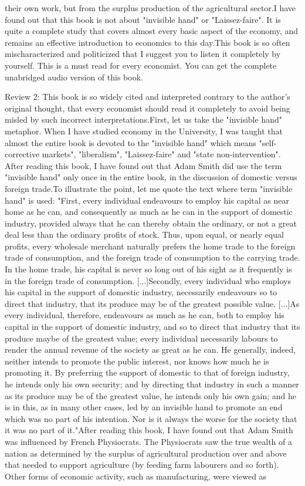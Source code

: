 \documentclass[12pt, a4paper[]{article}
\begin{document}
\begin{itemize}
{their own work, but from the surplus production of the agricultural sector.I have found out that this book is not about "invisible hand" or "Laissez-faire". It is quite a complete study that covers almost every basic aspect of the economy, and remains an effective introduction to economics to this day.This book is so often mischaracterized and politicized that I suggest you to listen it completely by yourself. This is a must read for every economist. You can get the complete unabridged audio version of this book.
    \item Review 2: This book is so widely cited and interpreted contrary to the author's original thought, that every economist should read it completely to avoid being misled by such incorrect interpretations.First, let us take the "invisible hand" metaphor. When I have studied economy in the University, I was taught that almost the entire book is devoted to the "invisible hand" which means "self-corrective markets", "liberalism", "Laissez-faire" and "state non-intervention". After reading this book, I have found out that Adam Smith did use the term "invisible hand" only once in the entire book, in the discussion of domestic versus foreign trade.To illustrate the point, let me quote the text where term "invisible hand" is used: "First, every individual endeavours to employ his capital as near home as he can, and consequently as much as he can in the support of domestic industry, provided always that he can thereby obtain the ordinary, or not a great deal less than the ordinary profits of stock. Thus, upon equal, or nearly equal profits, every wholesale merchant naturally prefers the home trade to the foreign trade of consumption, and the foreign trade of consumption to the carrying trade. In the home trade, his capital is never so long out of his sight as it frequently is in the foreign trade of consumption. [...]Secondly, every individual who employs his capital in the support of domestic industry, necessarily endeavours so to direct that industry, that its produce may be of the greatest possible value. [...]As every individual, therefore, endeavours as much as he can, both to employ his capital in the support of domestic industry, and so to direct that industry that its produce maybe of the greatest value; every individual necessarily labours to render the annual revenue of the society as great as he can. He generally, indeed, neither intends to promote the public interest, nor knows how much he is promoting it. By preferring the support of domestic to that of foreign industry, he intends only his own security; and by directing that industry in such a manner as its produce may be of the greatest value, he intends only his own gain; and he is in this, as in many other cases, led by an invisible hand to promote an end which was no part of his intention. Nor is it always the worse for the society that it was no part of it."After reading this book, I have found out that Adam Smith was influenced by French Physiocrats. The Physiocrats saw the true wealth of a nation as determined by the surplus of agricultural production over and above that needed to support agriculture (by feeding farm labourers and so forth). Other forms of economic activity, such as manufacturing, were viewed as }
\end{itemize}
\end{document}

